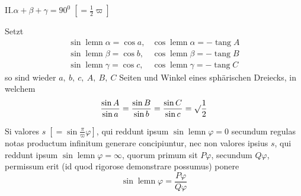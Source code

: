 \par{}\noindent II.\hfill $\alpha+\beta+\gamma=90^0\;[=\tfrac12\varpi]$\hfill\mbox{}

Setzt
\[
\begin{array}{ll}
\sin\operatorname{lemn}\alpha=\cos a,&\cos\operatorname{lemn}\alpha=-\operatorname{tang}A\\[5pt]
\sin\operatorname{lemn}\beta=\cos b,&\cos\operatorname{lemn}\beta=-\operatorname{tang}B\\[5pt]
\sin\operatorname{lemn}\gamma=\cos c,&\cos\operatorname{lemn}\gamma=-\operatorname{tang}C
\end{array}
\]
so sind wieder $a,\ b,\ c,\ A,\ B,\ C$ Seiten und Winkel eines sphärischen Dreiecks, in welchem
\[
\dfrac{\sin A}{\sin a}=\dfrac{\sin B}{\sin b}=\dfrac{\sin C}{\sin c}=\surd\dfrac12
\]

Si valores $s\;[=\sin\frac{\pi}{\varpi}\varphi]$, qui reddunt ipsum $\sin\operatorname{lemn}\varphi=0$ secundum regulas notas productum infinitum generare concipiuntur, nec non valores ipsius $s$, qui reddunt ipsum $\sin\operatorname{lemn}\varphi=\infty$, quorum primum sit $P\varphi$, secundum $Q\varphi$, permissum erit (id quod rigorose demonstrare possumus) ponere
\[
\sin\operatorname{lemn}\varphi=\dfrac{P\varphi}{Q\varphi}
\]


